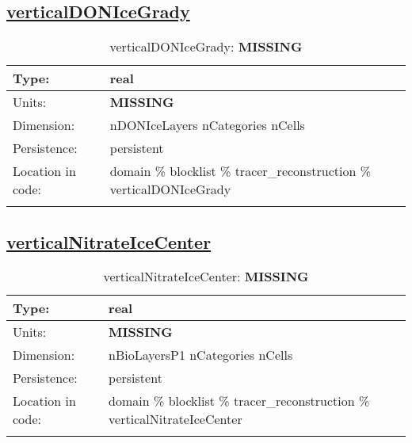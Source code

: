 \subsection[verticalDONIceGrady]{\hyperref[sec:var_tab_tracer_reconstruction]{verticalDONIceGrady}}
\label{subsec:var_sec_tracer_reconstruction_verticalDONIceGrady}
\begin{center}
\begin{longtable}{| p{2.0in} | p{4.0in} |}
        \hline 
        Type: & real \\
        \hline 
        Units: & {\bf \color{red} MISSING} \\
        \hline 
        Dimension: & nDONIceLayers nCategories nCells \\
        \hline 
        Persistence: & persistent \\
        \hline 
         Location in code: & domain \% blocklist \% tracer\_reconstruction \% verticalDONIceGrady \\
         \hline 
    \caption{verticalDONIceGrady: {\bf \color{red} MISSING}}
\end{longtable}
\end{center}
\subsection[verticalNitrateIceCenter]{\hyperref[sec:var_tab_tracer_reconstruction]{verticalNitrateIceCenter}}
\label{subsec:var_sec_tracer_reconstruction_verticalNitrateIceCenter}
\begin{center}
\begin{longtable}{| p{2.0in} | p{4.0in} |}
        \hline 
        Type: & real \\
        \hline 
        Units: & {\bf \color{red} MISSING} \\
        \hline 
        Dimension: & nBioLayersP1 nCategories nCells \\
        \hline 
        Persistence: & persistent \\
        \hline 
         Location in code: & domain \% blocklist \% tracer\_reconstruction \% verticalNitrateIceCenter \\
         \hline 
    \caption{verticalNitrateIceCenter: {\bf \color{red} MISSING}}
\end{longtable}
\end{center}

